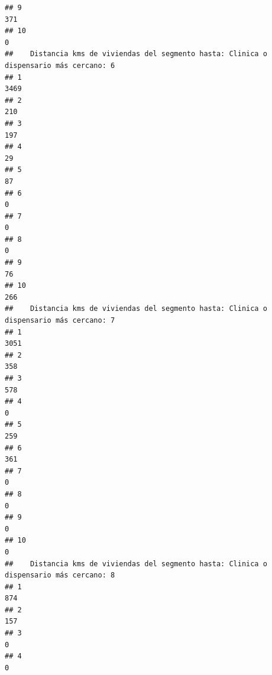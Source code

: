 \documentclass[11pt,]{article}
\begin{document}
\begin{verbatim}
## 9                                                                                  371
## 10                                                                                   0
##    Distancia kms de viviendas del segmento hasta: Clinica o dispensario más cercano: 6
## 1                                                                                 3469
## 2                                                                                  210
## 3                                                                                  197
## 4                                                                                   29
## 5                                                                                   87
## 6                                                                                    0
## 7                                                                                    0
## 8                                                                                    0
## 9                                                                                   76
## 10                                                                                 266
##    Distancia kms de viviendas del segmento hasta: Clinica o dispensario más cercano: 7
## 1                                                                                 3051
## 2                                                                                  358
## 3                                                                                  578
## 4                                                                                    0
## 5                                                                                  259
## 6                                                                                  361
## 7                                                                                    0
## 8                                                                                    0
## 9                                                                                    0
## 10                                                                                   0
##    Distancia kms de viviendas del segmento hasta: Clinica o dispensario más cercano: 8
## 1                                                                                  874
## 2                                                                                  157
## 3                                                                                    0
## 4                                                                                    0

\end{verbatim}
\end{document}
